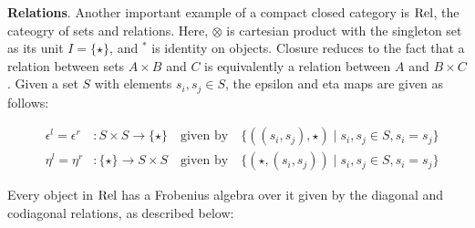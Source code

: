 
\medskip
\noindent
{\bf Relations}.
Another important example of a  compact closed category is
$\mathrm{Rel}$, the cateogry of sets and relations. Here, $\otimes$ is
cartesian product with the singleton set as its unit $I = \{\star\}$, and $^*$ is identity on objects. Closure reduces to the
fact that a relation between sets $A\times B$ and $C$ is equivalently a relation between $A$ and $B \times C$.   Given a set $S$ with elements $s_i, s_j \in S$,  the epsilon and eta maps are given as follows:

\begin{eqnarray*}
&\epsilon^l  =  \epsilon^r &\colon   S \times S \to \{\star\} \quad \mbox{given by} \quad
\{((s_i, s_j), \star) \mid s_i, s_j \in S, s_i = s_j \}\\
&\eta^l = \eta^r& \colon   \{\star\}  \to S \times S
\quad \mbox{given by} \quad 
\{(\star, (s_i, s_j)) \mid s_i, s_j \in S, s_i = s_j\}
\end{eqnarray*}



Every object in $\mathrm{Rel}$  has a
Frobenius algebra over it given by the diagonal and codiagonal
relations, as described below: 




